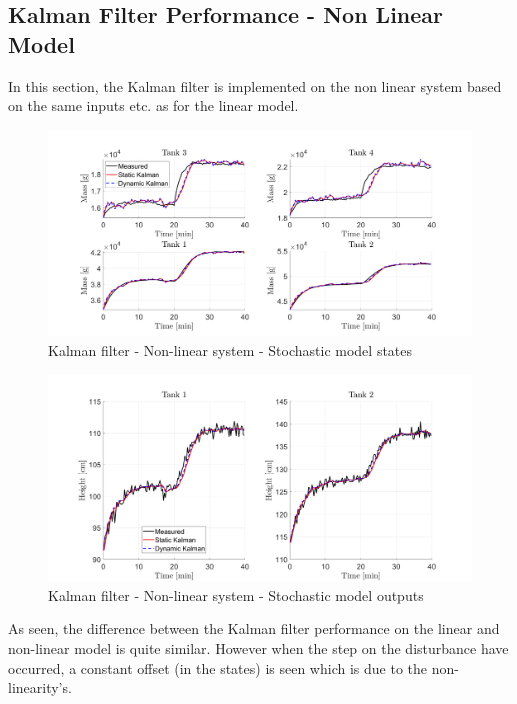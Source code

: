 \subsection{Kalman Filter Performance - Non Linear Model}
In this section, the Kalman filter is implemented on the non linear system based on the same inputs etc. as for the linear model.
\begin{figure}[H]
    \centering
    \includegraphics[width=1\textwidth]{Figures/Pr5.4_stoc_states.png}
    \caption{Kalman filter - Non-linear system - Stochastic model states}
\end{figure}
\begin{figure}[H]
    \centering
    \includegraphics[width=1\textwidth]{Figures/Pr5.4_stoc_output.png}
    \caption{Kalman filter - Non-linear system - Stochastic model outputs}
\end{figure}
As seen, the difference between the Kalman filter performance on the linear and non-linear model is quite similar. However when the step on the disturbance have occurred, a constant offset (in the states) is seen which is due to the non-linearity's. 
